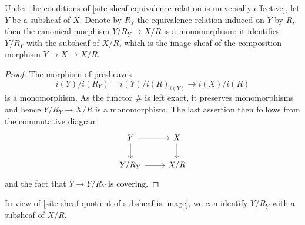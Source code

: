 \begin{proposition}\label{site sheaf quotient of subsheaf is image}
Under the conditions of \cref{site sheaf equivalence relation is universally effective}, let $Y$ be a subsheaf of $X$. Denote by $R_Y$ the equivalence relation induced on $Y$ by $R$, then the canonical morphism $Y/R_Y\to X/R$ is a monomorphism: it identifies $Y/R_Y$ with the subsheaf of $X/R$, which is the image sheaf of the composition morphism $Y\to X\to X/R$.
\end{proposition}
\begin{proof}
The morphism of presheaves
\[i(Y)/i(R_Y)=i(Y)/i(R)_{i(Y)}\to i(X)/i(R)\]
is a monomorphism. As the functor $\#$ is left exact, it preserves monomorphisms and hence $Y/R_Y\to X/R$ is a monomorphism. The last assertion then follows from the commutative diagram
\[\begin{tikzcd}
Y\ar[r]\ar[d]&X\ar[d]\\
Y/R_Y\ar[r]&X/R
\end{tikzcd}\]
and the fact that $Y\to Y/R_Y$ is covering.
\end{proof}
In view of \ref{site sheaf quotient of subsheaf is image}, we can identify $Y/R_Y$ with a subsheaf of $X/R$.

